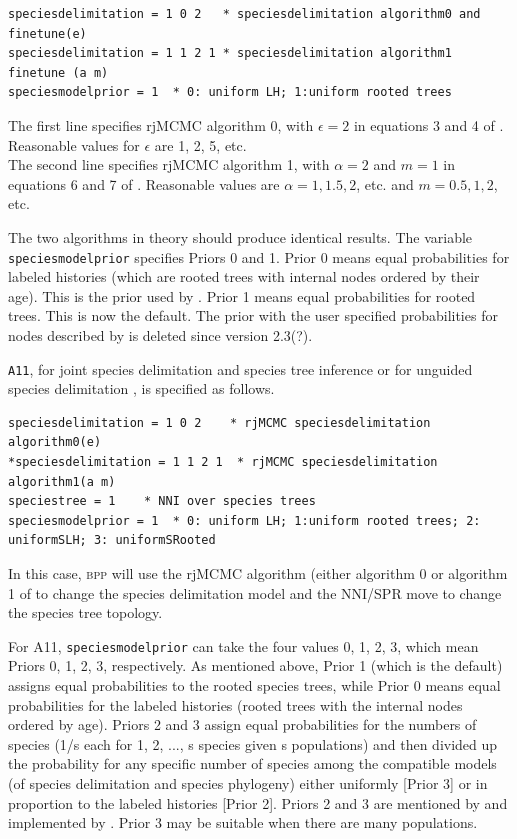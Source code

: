 \documentclass{book}
\numberwithin{equation}{section} \renewcommand{\baselinestretch}{0.55}
\begin{document}
\begin{verbatim}
speciesdelimitation = 1 0 2   * speciesdelimitation algorithm0 and finetune(e)
speciesdelimitation = 1 1 2 1 * speciesdelimitation algorithm1 finetune (a m)
speciesmodelprior = 1  * 0: uniform LH; 1:uniform rooted trees
\end{verbatim}

The first line specifies rjMCMC algorithm 0, with $\epsilon = 2$ in
equations 3 and 4 of \cite{Yang2010}.  Reasonable values for
$\epsilon$ are 1, 2, 5, etc. \\ The second line specifies rjMCMC
algorithm 1, with $ \alpha = 2$ and $m = 1$ in equations 6 and 7 of
\cite{Yang2010}. Reasonable values are $\alpha = 1, 1.5, 2$, etc. and
$m = 0.5, 1, 2$, etc.

The two algorithms in theory should produce identical results.  The
variable \texttt{speciesmodelprior} specifies Priors 0 and 1.  Prior 0
means equal probabilities for labeled histories (which are rooted
trees with internal nodes ordered by their age).  This is the prior
used by \cite[][eq.~2]{Yang2010}.  Prior 1 means equal probabilities
for rooted trees.  This is now the default.  The prior with the user
specified probabilities for nodes described by \cite{Rannala2013} is
deleted since version 2.3(?).

\texttt{A11}, for joint species delimitation and species tree
inference or for unguided species delimitation \cite{Yang2014a}, is
specified as follows.
\begin{verbatim}
speciesdelimitation = 1 0 2    * rjMCMC speciesdelimitation algorithm0(e)
*speciesdelimitation = 1 1 2 1  * rjMCMC speciesdelimitation algorithm1(a m)
speciestree = 1    * NNI over species trees
speciesmodelprior = 1  * 0: uniform LH; 1:uniform rooted trees; 2: uniformSLH; 3: uniformSRooted
\end{verbatim}

In this case, \textsc{bpp} will use the rjMCMC algorithm (either
algorithm 0 or algorithm 1 of \cite{Yang2010} to change the species
delimitation model and the NNI/SPR move to change the species tree
topology.

For A11, \texttt{speciesmodelprior} can take the four values 0, 1, 2,
3, which mean Priors 0, 1, 2, 3, respectively.  As mentioned above,
Prior 1 (which is the default) assigns equal probabilities to the
rooted species trees, while Prior 0 means equal probabilities for the
labeled histories (rooted trees with the internal nodes ordered by
age).  Priors 2 and 3 assign equal probabilities for the numbers of
species (1/s each for 1, 2, ..., s species given s populations) and
then divided up the probability for any specific number of species
among the compatible models (of species delimitation and species
phylogeny) either uniformly [Prior 3] or in proportion to the labeled
histories [Prior 2].  Priors 2 and 3 are mentioned by \cite{Yang2014a}
and implemented by \cite{Yang2015}.  Prior 3 may be suitable when
there are many populations.
\end{document}
